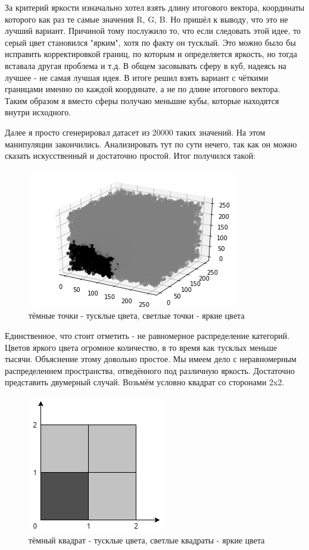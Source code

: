 \documentclass[12pt]{article}
\begin{document}
	За критерий яркости изначально хотел взять длину итогового вектора, координаты которого как раз те самые значения R, G, B. Но пришёл к выводу, что это не лучший вариант. Причиной тому послужило то, что если следовать этой идее, то серый цвет становился "ярким", хотя по факту он тусклый. Это можно было бы исправить корректировкой границ, по которым и определяется яркость, но тогда вставала другая проблема и т.д. В общем засовывать сферу в куб, надеясь на лучшее - не самая лучшая идея. В итоге решил взять вариант с чёткими границами именно по каждой координате, а не по длине итогового вектора. Таким образом я вместо сферы получаю меньшие кубы, которые находятся внутри исходного.
	
	Далее я просто сгенерировал датасет из 20000 таких значений. На этом манипуляции закончились. Анализировать тут по сути нечего, так как он можно сказать искусственный и достаточно простой. Итог получился такой: 
	
	\begin{figure}[H]
	    \centering
	    \includegraphics[scale=0.75]{Cube.png}
	    \caption{тёмные точки - тусклые цвета, светлые точки - яркие цвета}
	    \label{fig:my_label}
	\end{figure}
	
	Единственное, что стоит отметить - не равномерное распределение категорий. Цветов яркого цвета огромное количество, в то время как тусклых меньше тысячи. Объяснение этому довольно простое. Мы имеем дело с неравномерным распределением пространства, отведённого под различную яркость. Достаточно представить двумерный случай. Возьмём условно квадрат со сторонами 2x2. 
	
	\begin{figure}[H]
	    \centering
	    \includegraphics[scale=0.75]{distr.png}
	    \caption{тёмный квадрат - тусклые цвета, светлые квадраты - яркие цвета}
	    \label{fig:my_label}
	\end{figure}
	
\end{document}
